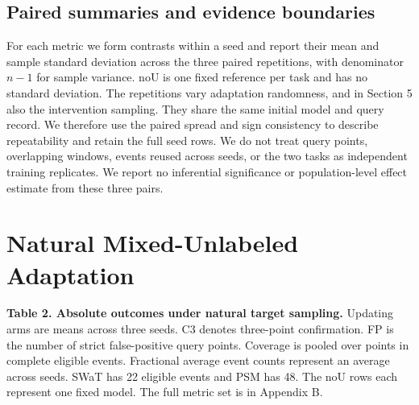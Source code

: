 \documentclass[
  american,
]{article}
\begin{document}
\subsection{Paired summaries and evidence
boundaries}\label{paired-summaries-and-evidence-boundaries}

For each metric we form contrasts within a seed and report their mean
and sample standard deviation across the three paired repetitions, with
denominator \(n-1\) for sample variance. noU is one fixed reference per
task and has no standard deviation. The repetitions vary adaptation
randomness, and in Section 5 also the intervention sampling. They share
the same initial model and query record. We therefore use the paired
spread and sign consistency to describe repeatability and retain the
full seed rows. We do not treat query points, overlapping windows,
events reused across seeds, or the two tasks as independent training
replicates. We report no inferential significance or population-level
effect estimate from these three pairs.

\section{Natural Mixed-Unlabeled
Adaptation}\label{natural-mixed-unlabeled-adaptation}

\textbf{Table 2. Absolute outcomes under natural target sampling.}
Updating arms are means across three seeds. C3 denotes three-point
confirmation. FP is the number of strict false-positive query points.
Coverage is pooled over points in complete eligible events. Fractional
average event counts represent an average across seeds. SWaT has 22
eligible events and PSM has 48. The noU rows each represent one fixed
model. The full metric set is in Appendix B.
\end{document}
